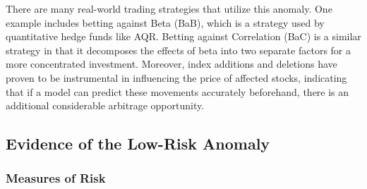 \documentclass[12pt,twoside]{reedthesis}
\theoremstyle{definition}
\theoremstyle{definition}
\theoremstyle{definition}
\theoremstyle{remark}
\begin{document}
There are many real-world trading strategies that utilize this anomaly.
One example includes betting against Beta (BaB), which is a strategy
used by quantitative hedge funds like AQR. Betting against Correlation
(BaC) is a similar strategy in that it decomposes the effects of beta
into two separate factors for a more concentrated investment. Moreover,
index additions and deletions have proven to be instrumental in
influencing the price of affected stocks, indicating that if a model can
predict these movements accurately beforehand, there is an additional
considerable arbitrage opportunity.

\subsection{Evidence of the Low-Risk
Anomaly}\label{evidence-of-the-low-risk-anomaly}

\subsubsection{Measures of Risk}\label{measures-of-risk}
\end{document}
